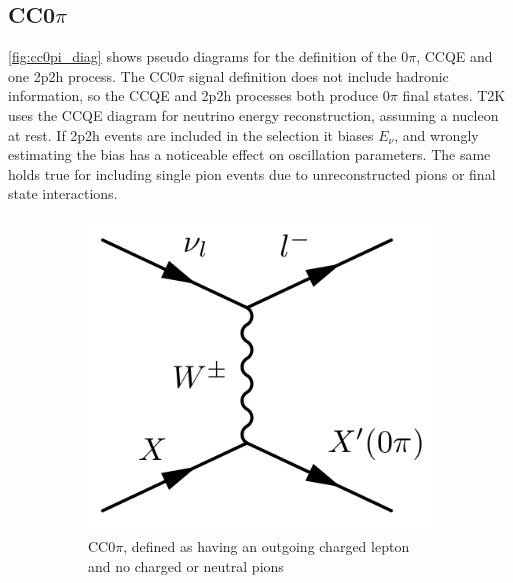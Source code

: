 \subsection{CC0$\pi$}
\autoref{fig:cc0pi_diag} shows pseudo diagrams for the definition of the 0$\pi$, CCQE and one 2p2h process. The CC0$\pi$ signal definition does not include hadronic information, so the CCQE and 2p2h processes both produce 0$\pi$ final states. T2K uses the CCQE diagram for neutrino energy reconstruction, assuming a nucleon at rest. If 2p2h events are included in the selection it biases $E_\nu$, and wrongly estimating the bias has a noticeable effect on oscillation parameters. The same holds true for including single pion events due to unreconstructed pions or final state interactions.
\begin{figure}[h]
	\centering
	\begin{subfigure}[t]{0.32\textwidth}
		\includegraphics[width=\textwidth, trim={0mm 0mm 0mm 0mm}, clip,page=1]{figures/niwg/diagrams/CC0pi}
		\caption{CC0$\pi$, defined as having an outgoing charged lepton and no charged or neutral pions}
	\end{subfigure}
	\begin{subfigure}[t]{0.32\textwidth}

\end{subfigure}
\end{figure}
